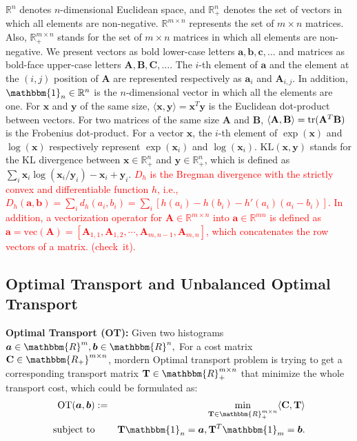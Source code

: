 \documentclass[twoside]{article}
\theoremstyle{plain}
\newcommand{\R}{\mathbbm{R}}
\newcommand{\one}{\mathbbm{1}}
\newcommand{\mat}[1]{\mathbf{#1}}
\renewcommand{\vec}[1]{\bm{#1}}
\newcommand{\changeHK}[1]{\textcolor{red}{#1}}
\begin{document}
$\mathbb{R}^n$ denotes $n$-dimensional Euclidean space, and $\mathbb{R}^n_+$ denotes the set of vectors in which all elements are non-negative. $\mathbb{R}^{m \times n}$ represents the set of $m \times n$ matrices. Also, $\mathbb{R}^{m \times n}_+$ stands for the set of $m \times n$ matrices in which all elements are non-negative. We present vectors as bold lower-case letters $\vec{a},\vec{b},\vec{c},\dots$ and matrices as bold-face upper-case letters $\mat{A},\mat{B},\mat{C},\dots$. The $i$-th element of $\vec{a}$ and the element at the $(i,j)$ position of $\mat{A}$ are represented respectively as $\vec{a}_i$ and $\mat{A}_{i,j}$. In addition, $\one_n \in \mathbb{R}^n$ is the $n$-dimensional vector in which all the elements are one. For $\vec{x}$ and $\vec{y}$ of the same size, $\langle \vec{x},\vec{y} \rangle = \vec{x}^T\vec{y}$ is the Euclidean dot-product between vectors. For two matrices of the same size $\mat{A}$ and $\mat{B}$, $\langle \mat{A},\mat{B}\rangle={\rm tr}(\mat{A}^T\mat{B})$ is the Frobenius dot-product. For a vector $\vec{x}$, the $i$-th element of $\exp (\vec{x})$ and $\log (\vec{x})$ respectively represent $\exp (\vec{x}_i)$ and $\log (\vec{x}_i)$. $\mathrm{KL}(\vec{x},\vec{y})$ stands for the KL divergence between $\vec{x} \in \mathbb{R}_+^n$ and $\vec{y} \in \mathbb{R}_+^n$, which is defined as $\sum_i \vec{x}_i \log {(\vec{x}_i/\vec{y}_i)} - \vec{x}_i + \vec{y}_i$. \changeHK{$D_h$ is the Bregman divergence with the strictly convex and differentiable function $h$, i.e., $D_h(\vec{a},\vec{b})=\sum_{i} d_h(a_i, b_i)=\sum_i [h(a_i) - h(b_i) - h'(a_i)(a_i -b_i)]$. In addition, a vectorization operator for $\mat{A} \in \mathbb{R}^{m \times n}$ into $\vec{a} \in \mathbb{R}^{mn}$ is defined as $\vec{a}=\text{vec}(\mat{A})=[\mat{A}_{1,1}, \mat{A}_{1,2}, \cdots, \mat{A}_{m,n-1}, \mat{A}_{m,n}]$, which concatenates the row vectors of a matrix. (check\ it).}
 


\subsection{Optimal Transport and Unbalanced Optimal Transport}
{\bf Optimal Transport (OT):} Given two histograms $\vec{a}\in \R^{m}, \vec{b} \in \R^{n},$ For a cost matrix $\mat{C} \in \mathbbm{R_{+}}^{m \times n}$, mordern Optimal transport problem is trying to get a corresponding transport matrix $\mat{T} \in \R_{+}^{m \times n}$ that minimize the whole transport cost, which could be formulated as:
\begin{eqnarray}
\label{Eq:Standard_OT}
\operatorname{OT}(\vec{a},\vec{b}) &:=& \min_{ \mat{T} \in \R_{+}^{m \times n}} \langle \mat{C}, \mat{T} \rangle \\
\text{subject\ to}&& \mat{T} \one_n= \vec{a}, \mat{T}^{T}\one_m = \vec{b}. \notag
\end{eqnarray}
\end{document}
